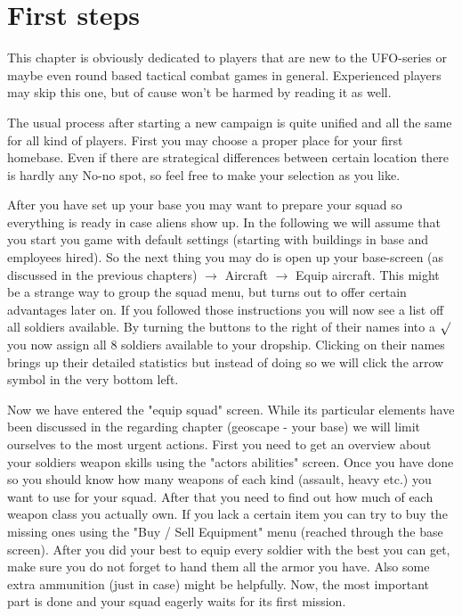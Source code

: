 \section{First steps}
This chapter is obviously dedicated to players that are new to the UFO-series or maybe even round based tactical combat games in general. Experienced players may skip this one, but of cause won't be harmed by reading it as well.

The usual process after starting a new campaign is quite unified and all the same for all kind of players. First you may choose a proper place for your first homebase. Even if there are strategical differences between certain location there is hardly any No-no spot, so feel free to make your selection as you like.

After you have set up your base you may want to prepare your squad so everything is ready in case aliens show up. In the following we will assume that you start you game with default settings (starting with buildings in base and employees hired). So the next thing you may do is open up your base-screen (as discussed in the previous chapters) $\rightarrow$ Aircraft $\rightarrow$ Equip aircraft. This might be a strange way to group the squad menu, but turns out to offer certain advantages later on. If you followed those instructions you will now see a list off all soldiers available. By turning the  buttons to the right of their names into a $\surd$ you now assign all 8 soldiers available to your dropship. Clicking on their names brings up their detailed statistics but instead of doing so we will click the arrow symbol in the very bottom left.

Now we have entered the "equip squad" screen. While its particular elements have been discussed in the regarding chapter (geoscape - your base) we will limit ourselves to the most urgent actions. First you need to get an overview about your soldiers weapon skills using the "actors abilities" screen. Once you have done so you should know how many weapons of each kind (assault, heavy etc.) you want to use for your squad. After that you need to find out how much of each weapon class you actually own. If you lack a certain item you can try to buy the missing ones using the "Buy / Sell Equipment" menu (reached through the base screen). After you did your best to equip every soldier with the best you can get, make sure you do not forget to hand them all the armor you have. Also some extra ammunition (just in case) might be helpfully. Now, the most important part is done and your squad eagerly waits for its first mission.

